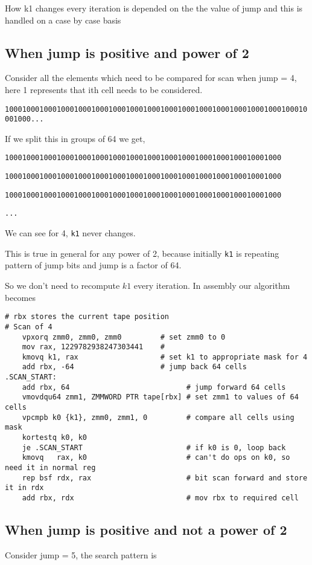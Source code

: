 \documentclass[11pt,answers]{exam}
\begin{document}
How k1 changes every iteration is depended on the the value of jump and this is handled on a case by case basis

\subsection{When jump is positive and power of 2}
Consider all the elements which need to be compared for scan when jump = 4, here 1 represents that ith cell needs to be considered.

\texttt{1000100010001000100010001000100010001000100010001000100010001000100010001000...}

\bigskip
If we split this in groups of 64 we get,

\texttt{1000100010001000100010001000100010001000100010001000100010001000}

\texttt{1000100010001000100010001000100010001000100010001000100010001000}

\texttt{1000100010001000100010001000100010001000100010001000100010001000}

\texttt{...}

We can see for 4, \texttt{k1} never changes.

This is true in general for any power of 2, because initially \texttt{k1} is repeating pattern of jump bits and jump is a factor of 64.

So we don't need to recompute $k1$ every iteration. In assembly our algorithm becomes

	{\renewcommand\fcolorbox[4][]{\textcolor{cyan}{\strut#4}}
		\begin{verbatim}
# rbx stores the current tape position
# Scan of 4
    vpxorq zmm0, zmm0, zmm0         # set zmm0 to 0
    mov rax, 1229782938247303441    # 
    kmovq k1, rax                   # set k1 to appropriate mask for 4
    add rbx, -64                    # jump back 64 cells
.SCAN_START:
    add rbx, 64                           # jump forward 64 cells
    vmovdqu64 zmm1, ZMMWORD PTR tape[rbx] # set zmm1 to values of 64 cells
    vpcmpb k0 {k1}, zmm0, zmm1, 0         # compare all cells using mask
    kortestq k0, k0
    je .SCAN_START                        # if k0 is 0, loop back
    kmovq   rax, k0                       # can't do ops on k0, so need it in normal reg
    rep bsf rdx, rax                      # bit scan forward and store it in rdx 
    add rbx, rdx                          # mov rbx to required cell
\end{verbatim}
	}


\subsection{When jump is positive and not a power of 2}
Consider jump = 5, the search pattern is
\end{document}
